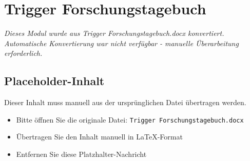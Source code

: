 
\section{Trigger Forschungstagebuch}
\label{sec:trigger-forschungstagebuch}

\begin{center}
\textit{Dieses Modul wurde aus Trigger Forschungstagebuch.docx konvertiert.\\
Automatische Konvertierung war nicht verfügbar - manuelle Überarbeitung erforderlich.}
\end{center}


\subsection{Placeholder-Inhalt}

Dieser Inhalt muss manuell aus der ursprünglichen Datei übertragen werden.

\begin{itemize}
\item Bitte öffnen Sie die originale Datei: \texttt{Trigger Forschungstagebuch.docx}
\item Übertragen Sie den Inhalt manuell in LaTeX-Format
\item Entfernen Sie diese Platzhalter-Nachricht
\end{itemize}
